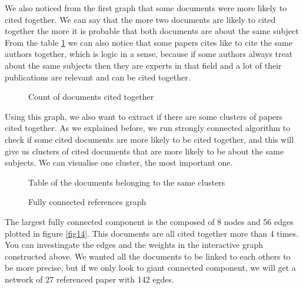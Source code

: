 \documentclass[article,twocolumn]{IEEEtran}
\begin{document}
    We also noticed from the first graph that some documents were more
likely to cited together. We can say that the more two documents are
likely to cited together the more it is probable that both documents are
about the same subject From the table \ref{fig8} we can also notice that
some papers cites like to cite the same authors together, which is logic
in a sense, because if some authors always treat about the same subjects
then they are experts in that field and a lot of their publications are
relevant and can be cited together.


    \begin{figure}
        \begin{center}\end{center}
        \caption{Count of documents cited together}
        \label{fig8}
    \end{figure}
    
    Using this graph, we also want to extract if there are some clusters of
papers cited together. As we explained before, we run strongly connected
algorithm to check if some cited documents are more likely to be cited
together, and this will give us clusters of cited documents that are
more likely to be about the same subjects. We can visualise one cluster,
the most important one.



    \begin{figure}
        \begin{center}\end{center}
        \caption{Table of the documents belonging to the same clusters}
        \label{fig9}
    \end{figure}
    


    \begin{figure}
        \begin{center}\end{center}
        \caption{Fully connected references graph}
        \label{fig12}
    \end{figure}
    
    The largest fully connected component is the composed of 8 nodes and 56
edges plotted in figure \ref{fig14}. This documents are all cited
together more than 4 times. You can investingate the edges and the
weights in the interactive graph constructed above. We wanted all the
documents to be linked to each others to be more precise, but if we only
look to giant connected component, we will get a network of 27
referenced paper with 142 egdes.
\end{document}
